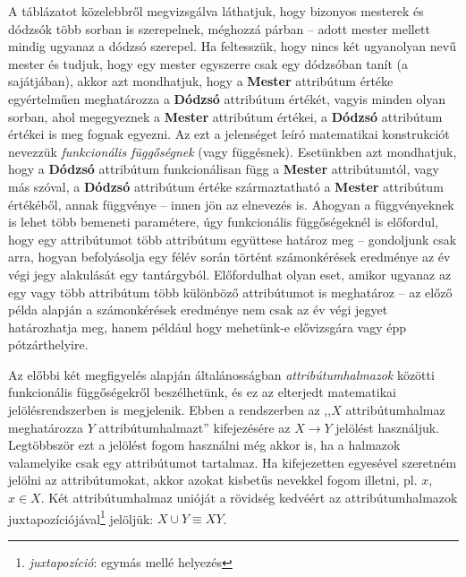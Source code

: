 %
A táblázatot közelebbről megvizsgálva láthatjuk, hogy bizonyos mesterek és dódzsók több sorban is szerepelnek, méghozzá párban -- adott mester mellett mindig ugyanaz a dódzsó szerepel.
Ha feltesszük, hogy nincs két ugyanolyan nevű mester és tudjuk, hogy egy mester egyszerre csak egy dódzsóban tanít (a sajátjában), akkor azt mondhatjuk, hogy a \textbf{Mester} attribútum értéke egyértelműen meghatározza a \textbf{Dódzsó} attribútum értékét, vagyis minden olyan sorban, ahol megegyeznek a \textbf{Mester} attribútum értékei, a \textbf{Dódzsó} attribútum értékei is meg fognak egyezni.
Az ezt a jelenséget leíró matematikai konstrukciót nevezzük \emph{funkcionális függőségnek} (vagy függésnek)\cite{Gajdos06}.
Esetünkben azt mondhatjuk, hogy a \textbf{Dódzsó} attribútum funkcionálisan függ a \textbf{Mester} attribútumtól, vagy más szóval, a \textbf{Dódzsó} attribútum értéke származtatható a \textbf{Mester} attribútum értékéből, annak függvénye -- innen jön az elnevezés is.
Ahogyan a függvényeknek is lehet több bemeneti paramétere, úgy funkcionális függőségeknél is előfordul, hogy egy attribútumot több attribútum együttese határoz meg -- gondoljunk csak arra, hogyan befolyásolja egy félév során történt számonkérések eredménye az év végi jegy alakulását egy tantárgyból.
Előfordulhat olyan eset, amikor ugyanaz az egy vagy több attribútum több különböző attribútumot is meghatároz -- az előző példa alapján a számonkérések eredménye nem csak az év végi jegyet határozhatja meg, hanem például hogy mehetünk-e elővizsgára vagy épp pótzárthelyire.

Az előbbi két megfigyelés alapján általánosságban \emph{attribútumhalmazok} közötti funkcionális függőségekről beszélhetünk, és ez az elterjedt matematikai jelölésrendszerben is megjelenik.
Ebben a rendszerben az ,,$X$ attribútumhalmaz meghatározza $Y$ attribútumhalmazt'' kifejezésére az $X \rightarrow Y$ jelölést használjuk.
Legtöbbször ezt a jelölést fogom használni még akkor is, ha a halmazok valamelyike csak egy attribútumot tartalmaz.
Ha kifejezetten egyesével szeretném jelölni az attribútumokat, akkor azokat kisbetűs nevekkel fogom illetni, pl. $x$, $x \in X$.
Két attribútumhalmaz unióját a rövidség kedvéért az attribútumhalmazok juxtapozíciójával\footnote{\emph{juxtapozíció}: egymás mellé helyezés} jelöljük: $X \cup Y \equiv XY$.

